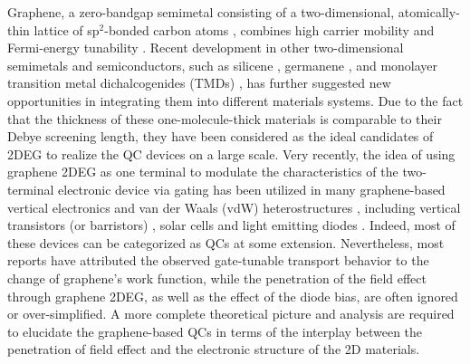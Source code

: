 Graphene, a zero-bandgap semimetal consisting of a two-dimensional, atomically-thin lattice of sp$^2$-bonded carbon atoms \cite{Novoselov2004Electric}, combines high carrier mobility \cite{Mayorov2011MicrometerScale} and Fermi-energy tunability \cite{Zhang2005Experimental, Das2008Monitoring, Yu2009Tuning}. 
Recent development in other two-dimensional semimetals and semiconductors, such as silicene \cite{Aufray2010silicene}, germanene \cite{Davila2014germanene}, 
and monolayer transition metal dichalcogenides (TMDs) \cite{wang2012electronics}, has further suggested new opportunities in integrating them into different materials systems.
Due to the fact that the thickness of these one-molecule-thick materials is comparable to their Debye screening length, 
they have been considered as the ideal candidates of 2DEG \cite{novoselov2012roadmap} to realize the QC devices on a large scale. 
Very recently, the idea of using graphene 2DEG as one terminal to modulate the characteristics of the two-terminal 
electronic device via gating has been utilized in many graphene-based vertical electronics and 
van der Waals (vdW) heterostructures \cite{geim2013van},
including vertical transistors 
(or barristors) \cite{Yang2012Graphene, yu2013vertically, georgiou2013vertical, Shih2015PartiallyScreened}, solar cells \cite{yu2013highly, britnell2013strong, Regan2012ScreeningEngineered} and light emitting diodes \cite{withers2015light}.
Indeed, most of these devices can be categorized as QCs at some extension.
Nevertheless, most reports have attributed the observed gate-tunable transport 
behavior to the change of graphene's work function, while the penetration of the 
field effect through graphene 2DEG, as well as the effect of the diode bias, are often ignored or over-simplified.
A more complete theoretical picture and analysis are required to elucidate the graphene-based QCs in terms of 
the interplay between the penetration of field effect and the electronic structure of the 2D materials. 

